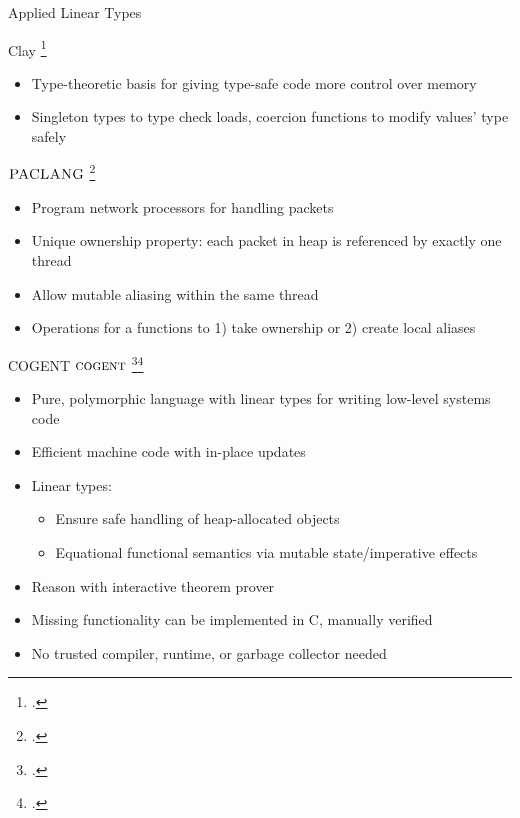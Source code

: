 \documentclass[aspectratio=169]{beamer}
\begin{document}
\begin{frame}{Applied Linear Types}
\footnotesize{
Clay \footcite{hawblitzel_low-level_2004}
  \begin{itemize}
    \item Type-theoretic basis for giving type-safe code more control over memory
    \item Singleton types to type check loads, coercion functions to modify values' type safely
  \end{itemize}

\pause

$\textsc{PACLANG}$ \footcite{ennals_linear_2004} %
  \begin{itemize}
    \item Program network processors for handling packets %
    \item Unique ownership property: each packet in heap is referenced by exactly one thread
    \item Allow mutable aliasing within the same thread
    \item Operations for a functions to 1) take ownership or 2) create local aliases
  \end{itemize}
}
\end{frame}

\begin{frame}{COGENT}
    $\textsc{cogent}$ \footcite{amani_cogent:_2016}\footcite{oconnor_cogent:_2016}
    \begin{itemize}[<+->]
        \item Pure, polymorphic language with linear types for writing low-level systems code 
        \item Efficient machine code with in-place updates
        \item Linear types:
            \begin{itemize}
                \item Ensure safe handling of heap-allocated objects
                \item Equational functional semantics via mutable state/imperative effects
            \end{itemize}
        \item Reason with \alert{interactive theorem prover}
        \item Missing functionality can be implemented in C, manually verified
        \item No trusted compiler, runtime, or garbage collector needed
    \end{itemize}
\end{frame}
\end{document}
